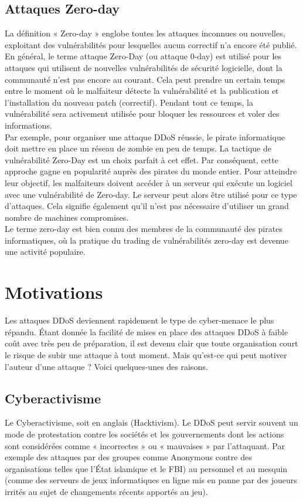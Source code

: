	\subsection{Attaques Zero-day}
La définition « Zero-day » englobe toutes les attaques inconnues ou nouvelles, exploitant des vulnérabilités pour lesquelles aucun correctif n'a encore été publié.
En général, le terme attaque Zero-Day (ou attaque 0-day) est utilisé pour les attaques qui utilisent de nouvelles vulnérabilités de sécurité logicielle, dont la communauté n'est pas encore au courant. Cela peut prendre un certain temps entre le moment où le malfaiteur détecte la vulnérabilité et la publication et l'installation du nouveau patch (correctif). Pendant tout ce temps, la vulnérabilité sera activement utilisée pour bloquer les ressources et voler des informations.\\ 

	Par exemple, pour organiser une attaque DDoS réussie, le pirate informatique doit mettre en place un réseau de zombie en peu de temps. La tactique de vulnérabilité Zero-Day est un choix parfait à cet effet. Par conséquent, cette approche gagne en popularité auprès des pirates du monde entier. Pour atteindre leur objectif, les malfaiteurs doivent accéder à un serveur qui exécute un logiciel avec une vulnérabilité de Zero-day. Le serveur peut alors être utilisé pour ce type d'attaques. Cela signifie également qu'il n'est pas nécessaire d'utiliser un grand nombre de machines compromises.\\

	Le terme zero-day est bien connu des membres de la communauté des pirates informatiques, où la pratique du trading de vulnérabilités zero-day est devenue une activité populaire.

	
	\section{Motivations}
	Les attaques DDoS deviennent rapidement le type de cyber-menace le plus répandu. Étant donnée la facilité de mises en place des attaques DDoS à faible coût avec très peu de préparation, il est devenu clair que toute organisation court le risque de subir une attaque à tout moment. Mais qu’est-ce qui peut motiver l’auteur d’une attaque ? 
Voici quelques-unes des raisons\cite{bellitddos}.

	\subsection{Cyberactivisme}
	Le Cyberactivisme, soit en anglais (Hacktivism). Le DDoS peut servir souvent un mode de protestation contre les sociétés et les gouvernements dont les actions sont considérées comme « incorrectes » ou « mauvaises » par l’attaquant. Par exemple des attaques par des groupes comme Anonymous contre des organisations telles que l’État islamique et le FBI) au personnel et au mesquin (comme des serveurs de jeux informatiques en ligne mis en panne par des joueurs irrités au sujet de changements récents apportés au jeu).

